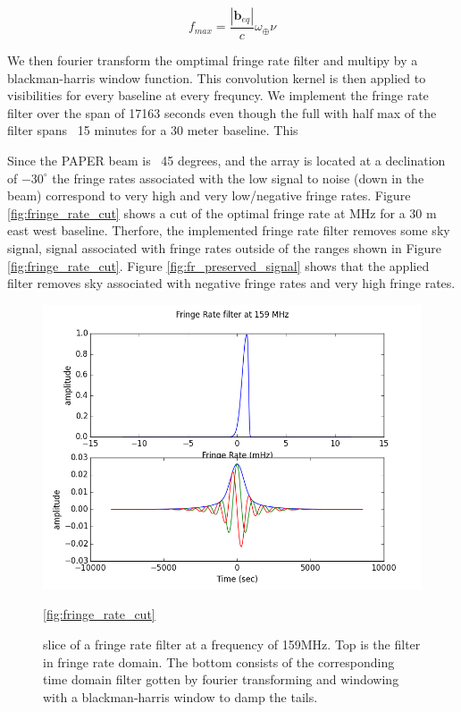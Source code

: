 \documentclass[twocolumn,numberedappendix]{emulateapj}
\begin{document}
\begin{equation}
    f_{max} = \frac{|\mathbf{b}_{eq}|}{c}\omega_{\oplus}\nu
\end{equation}


We then fourier transform the omptimal fringe rate filter and multipy by a
blackman-harris window function. This convolution kernel is then applied to 
visibilities for every baseline at every frequncy. We implement the fringe rate
filter over the span of 17163 seconds even though the full with half max of the
filter spans ~15 minutes for a 30 meter baseline. This 

Since the PAPER beam is ~45 degrees, and the array is located at a declination
of $-30^{\circ}$ the fringe rates associated with the low signal to noise (down
in the beam) correspond to very high and very low/negative fringe rates. Figure
\ref{fig:fringe_rate_cut} shows a cut of the optimal fringe rate at MHz for a 30
m east west baseline. Therfore, the implemented fringe rate filter removes some
sky signal, signal associated with fringe rates outside of the ranges shown in
Figure \ref{fig:fringe_rate_cut}. Figure \ref{fig:fr_preserved_signal} shows
that the applied filter removes sky associated with negative fringe rates and
very high fringe rates. 

\begin{figure}
\centering
\includegraphics[width=\columnwidth]{plots/fr_filter_slice.png}
\caption{slice of a fringe rate filter at a frequency of 159MHz. Top is the
filter in fringe rate domain. The bottom consists of the corresponding time
domain filter gotten by fourier transforming and windowing with a
blackman-harris window to damp the tails.}
\ref{fig:fringe_rate_cut}
\end{figure}
\end{document}
